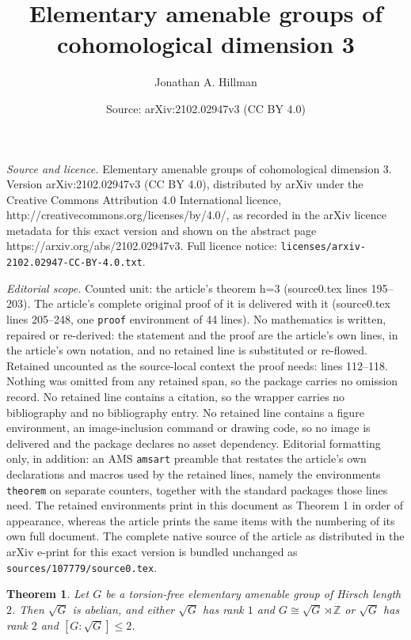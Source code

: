 \documentclass[10pt,a4paper]{amsart}
\title{Elementary amenable groups of cohomological dimension 3}
\author{Jonathan A. Hillman}
\date{Source: arXiv:2102.02947v3 (CC BY 4.0)}
\newtheorem{theorem}{Theorem}
\renewcommand{\leq}{\leqslant}
\begin{document}
\maketitle

\noindent\emph{Source and licence.} Elementary amenable groups of cohomological dimension 3. Version arXiv:2102.02947v3 (CC BY 4.0), distributed by arXiv under the Creative Commons Attribution 4.0 International licence, http://creativecommons.org/licenses/by/4.0/, as recorded in the arXiv licence metadata for this exact version and shown on the abstract page https://arxiv.org/abs/2102.02947v3. Full licence notice: \texttt{licenses/arxiv-2102.02947-CC-BY-4.0.txt}.\par\smallskip

\noindent\textit{Editorial scope.} Counted unit: the article's theorem h=3 (source0.tex lines 195--203). The article's complete original proof of it is delivered with it (source0.tex lines 205--248, one \texttt{proof} environment of 44 lines). No mathematics is written, repaired or re-derived: the statement and the proof are the article's own lines, in the article's own notation, and no retained line is substituted or re-flowed.  Retained uncounted as the source-local context the proof needs: lines 112--118.  Nothing was omitted from any retained span, so the package carries no omission record.  No retained line contains a citation, so the wrapper carries no bibliography and no bibliography entry.  No retained line contains a figure environment, an image-inclusion command or drawing code, so no image is delivered and the package declares no asset dependency.  Editorial formatting only, in addition: an AMS \texttt{amsart} preamble that restates the article's own declarations and macros used by the retained lines, namely the environments \texttt{theorem} on separate counters, together with the standard packages those lines need.  The retained environments print in this document as Theorem 1 in order of appearance, whereas the article prints the same items with the numbering of its own full document.  The complete native source of the article as distributed in the arXiv e-print for this exact version is bundled unchanged as \texttt{sources/107779/source0.tex}.
\begin{theorem}
\label{h=2}
Let $G$ be a torsion-free elementary amenable group of Hirsch length $2$.
Then $\sqrt{G}$ is abelian,
and either $\sqrt{G}$ has rank $1$ and $G\cong\sqrt{G}\rtimes\mathbb{Z}$
or $\sqrt{G}$ has rank $2$ and $[G:\sqrt{G}]\leq2$.
\end{theorem}
\end{document}
